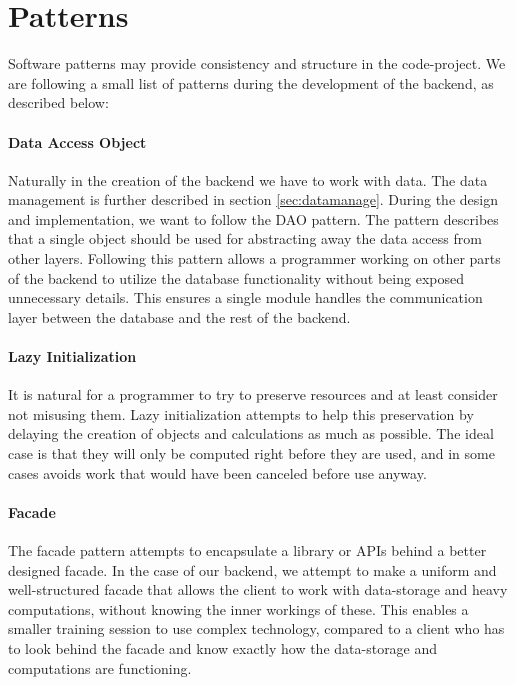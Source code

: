 \section{Patterns}
\label{sec:bpatterns}
Software patterns may provide consistency and structure in the code-project. We are following a small list of patterns during the development of the backend, as described below:

\paragraph{Data Access Object}
Naturally in the creation of the backend we have to work with data. The data management is further described in section \ref{sec:datamanage}. During the design and implementation, we want to follow the DAO pattern. The pattern describes that a single object should be used for abstracting away the data access from other layers. Following this pattern allows a programmer working on other parts of the backend to utilize the database functionality without being exposed unnecessary details. This ensures a single module handles the communication layer between the database and the rest of the backend.

\paragraph{Lazy Initialization}
It is natural for a programmer to try to preserve resources and at least consider not misusing them. Lazy initialization attempts to help this preservation by delaying the creation of objects and calculations as much as possible. The ideal case is that they will only be computed right before they are used, and in some cases avoids work that would have been canceled before use anyway.

\paragraph{Facade}
The facade pattern attempts to encapsulate a library or APIs behind a better designed facade. In the case of our backend, we attempt to make a uniform and well-structured facade that allows the client to work with data-storage and heavy computations, without knowing the inner workings of these. This enables a smaller training session to use complex technology, compared to a client who has to look behind the facade and know exactly how the data-storage and computations are functioning.
